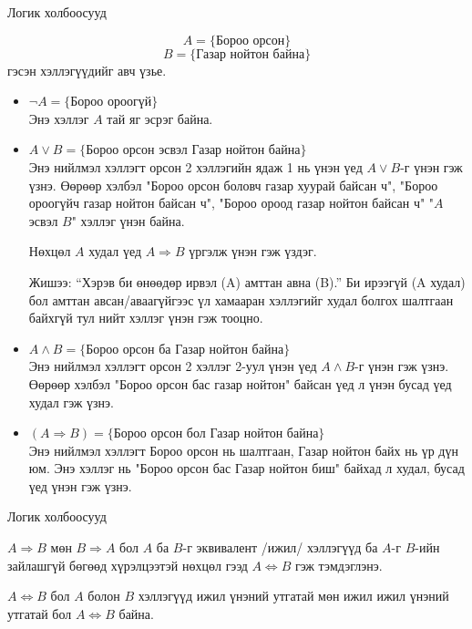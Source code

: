 \begin{frame}[allowframebreaks]{Логик холбоосууд}
\begin{example}
$$A=\{{\text{Бороо орсон}}\}$$
$$B=\{{\text{Газар нойтон байна}}\}$$ гэсэн хэллэгүүдийг авч үзье. 
\begin{itemize}
\item $\lnot A=\{{\text{Бороо ороогүй}}\}$\\
Энэ хэллэг $A$ тай яг эсрэг байна.
\item $A\lor B=\{{\text{Бороо орсон эсвэл Газар нойтон байна}}\}$\\
Энэ нийлмэл хэллэгт орсон 2 хэллэгийн ядаж 1 нь үнэн үед $A\lor B$-г үнэн гэж үзнэ. Өөрөөр хэлбэл "Бороо орсон боловч газар хуурай байсан ч", "Бороо ороогүйч газар нойтон байсан ч", "Бороо ороод газар нойтон байсан ч" "$A$ эсвэл $B$" хэллэг үнэн байна. 
\begin{remark}
    Нөхцөл $A$ худал үед $A\Rightarrow B$ үргэлж үнэн гэж үздэг. 
    
    Жишээ: ``Хэрэв би өнөөдөр ирвэл (A) амттан авна (B).'' Би ирээгүй (A худал) бол амттан авсан/аваагүйгээс үл хамааран хэллэгийг худал болгох шалтгаан байхгүй тул нийт хэллэг үнэн гэж тооцно.
\end{remark}
\item $A\land B=\{{\text{Бороо орсон ба Газар нойтон байна}}\}$\\
Энэ нийлмэл хэллэгт орсон 2 хэллэг 2-уул үнэн үед $A\land B$-г үнэн гэж үзнэ. Өөрөөр хэлбэл "Бороо орсон бас газар нойтон" байсан үед л үнэн бусад үед худал гэж үзнэ.
\item $(A\Rightarrow B)=\{{\text{Бороо орсон бол Газар нойтон байна}}\}$\\
Энэ нийлмэл хэллэгт Бороо орсон нь шалтгаан,   Газар нойтон байх нь үр дүн юм. Энэ хэллэг нь "Бороо орсон бас   Газар нойтон биш" байхад л худал, бусад үед үнэн гэж үзнэ. 
\end{itemize}
\end{example}
\end{frame}

\begin{frame}[allowframebreaks]{Логик холбоосууд}
\begin{definition} 
$A\Rightarrow B$ мөн $B\Rightarrow A$ бол $A$ ба $B$-г эквивалент  /ижил/ хэллэгүүд ба $A$-г $B$-ийн зайлашгүй бөгөөд хүрэлцээтэй нөхцөл гээд $A\Leftrightarrow B$ гэж тэмдэглэнэ. 
\end{definition} 
$A\Leftrightarrow B$ бол $A$ болон $B$ хэллэгүүд ижил үнэний утгатай мөн ижил ижил үнэний утгатай бол $A\Leftrightarrow B$ байна. 
\end{frame}

